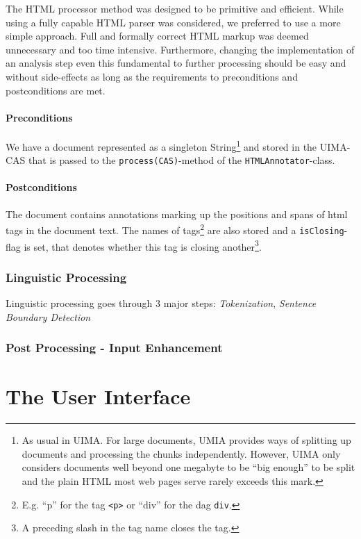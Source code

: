 \documentclass{article}
\begin{document}
The HTML processor method was designed to be primitive and efficient. While
using a fully capable HTML parser was considered, we preferred to use a more
simple approach. Full and formally correct HTML markup was deemed unnecessary and
too time intensive.
Furthermore, changing the
implementation of an analysis step even this fundamental to further processing
should be easy and without side-effects as long as the requirements to
preconditions and postconditions are met.

\paragraph{Preconditions} We have a document represented as a singleton
String\footnote{As usual in UIMA. For large documents, UMIA provides ways of
splitting up documents and processing the chunks independently. However, UIMA
only considers documents well beyond one megabyte to be ``big enough'' to be
split and the plain HTML most web pages serve rarely exceeds this mark.}   and
stored in the UIMA-CAS that is passed to the \verb#process(CAS)#-method of the
\verb#HTMLAnnotator#-class.
\paragraph{Postconditions} The document contains annotations marking up the
positions and spans of html tags in the document text. The names of
tags\footnote{E.g. ``p'' for the tag \texttt{<p>} or ``div'' for the dag
\texttt{div}.} are
also stored and a \verb#isClosing#-flag is set, that denotes whether this tag is
closing another\footnote{A preceding slash in the tag name closes the tag.}.

\subsubsection{Linguistic Processing}

Linguistic processing goes through 3 major steps: \emph{Tokenization},
\emph{Sentence Boundary Detection}

\subsubsection{Post Processing - Input Enhancement}

\section{The User Interface}
\end{document}
